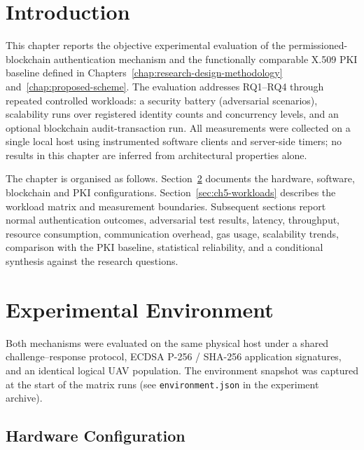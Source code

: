 
\section{Introduction}
\label{sec:ch5-intro}

This chapter reports the objective experimental evaluation of the permissioned-blockchain authentication mechanism and the functionally comparable X.509 PKI baseline defined in Chapters~\ref{chap:research-design-methodology} and~\ref{chap:proposed-scheme}. The evaluation addresses RQ1--RQ4 through repeated controlled workloads: a security battery (adversarial scenarios), scalability runs over registered identity counts and concurrency levels, and an optional blockchain audit-transaction run. All measurements were collected on a single local host using instrumented software clients and server-side timers; no results in this chapter are inferred from architectural properties alone.

The chapter is organised as follows. Section~\ref{sec:ch5-environment} documents the hardware, software, blockchain and PKI configurations. Section~\ref{sec:ch5-workloads} describes the workload matrix and measurement boundaries. Subsequent sections report normal authentication outcomes, adversarial test results, latency, throughput, resource consumption, communication overhead, gas usage, scalability trends, comparison with the PKI baseline, statistical reliability, and a conditional synthesis against the research questions.

\section{Experimental Environment}
\label{sec:ch5-environment}

Both mechanisms were evaluated on the same physical host under a shared challenge--response protocol, ECDSA P-256 / SHA-256 application signatures, and an identical logical UAV population. The environment snapshot was captured at the start of the matrix runs (see \texttt{environment.json} in the experiment archive).

\subsection{Hardware Configuration}
\label{sec:ch5-hardware}

